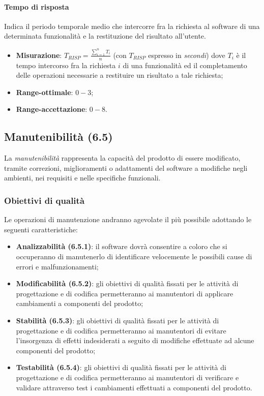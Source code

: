 \paragraph{Tempo di risposta}
Indica il periodo temporale medio che intercorre fra la richiesta al software di una determinata funzionalità e la restituzione del risultato all'utente.
\begin{itemize}
\item \textbf{Misurazione}: $T_{RISP} = \frac{\sum_{i=1}^{n} T_{i}}{n}$ (con $T_{RISP}$ espresso in \textit{secondi}) dove $T_{i}$ è il tempo intercorso fra la richiesta $i$ di una funzionalità ed il completamento delle operazioni necessarie a restituire un risultato a tale richiesta;
\item \textbf{Range-ottimale}: $0 - 3$;
\item \textbf{Range-accettazione}: $0 - 8$.
\end{itemize}

\subsection{Manutenibilità (6.5)}
La \textit{manutenibilità} rappresenta la capacità del prodotto di essere modificato, tramite correzioni, miglioramenti o adattamenti del software a modifiche negli ambienti, nei requisiti e nelle specifiche funzionali.
\subsubsection{Obiettivi di qualità}
Le operazioni di manutenzione andranno agevolate il più possibile adottando le seguenti caratteristiche:
\begin{itemize}
\item \textbf{Analizzabilità (6.5.1)}: il software dovrà consentire a coloro che si occuperanno di manutenerlo di identificare velocemente le possibili cause di errori e malfunzionamenti;
\item \textbf{Modificabilità (6.5.2)}: gli obiettivi di qualità fissati per le attività di progettazione e di codifica permetteranno ai manutentori di applicare cambiamenti a componenti del prodotto;
\item \textbf{Stabilità (6.5.3)}: gli obiettivi di qualità fissati per le attività di progettazione e di codifica permetteranno ai manutentori di evitare l'insorgenza di effetti indesiderati a seguito di modifiche effettuate ad alcune componenti del prodotto;
\item \textbf{Testabilità (6.5.4)}: gli obiettivi di qualità fissati per le attività di progettazione e di codifica permetteranno ai manutentori di verificare e validare attraverso test i cambiamenti effettuati a componenti del prodotto.
\end{itemize}
